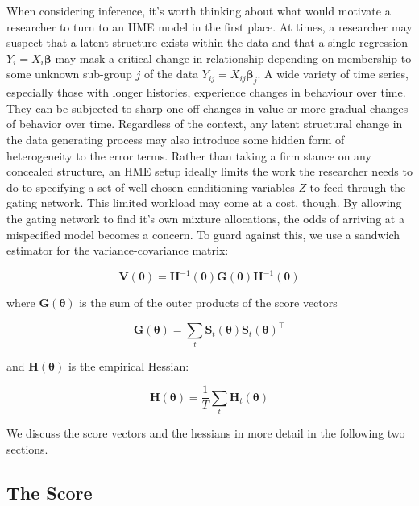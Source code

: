 \documentclass[12pt]{article}
\newcommand{\Ht}[1]{\mathbf{H}_{t}(#1)}
\newcommand{\HH}[1]{\boldsymbol{H}(#1)}
\newcommand{\HI}[1]{\boldsymbol{H}^{-1}(#1)}
\begin{document}
When considering inference, it's worth thinking about what would motivate
a researcher to turn to an HME model in the first place. At times,
a researcher may suspect that a latent structure exists within the data
and that a single regression $Y_{i} = X_{i} \boldsymbol{\beta}$
may mask a critical change in relationship depending on membership to
some unknown sub-group $j$ of the data $Y_{ij} = X_{ij} \boldsymbol{\beta}_{j}$.
A wide variety of time series, especially those with longer histories,
experience changes in behaviour over time. They can be subjected to sharp one-off
changes in value or more gradual changes of behavior over time. Regardless of
the context, any latent structural change in the data generating
process may also introduce some hidden form of heterogeneity to the error terms. 
Rather than taking a firm stance on any concealed structure, an HME
setup ideally limits the work the researcher needs to do to specifying
a set of well-chosen conditioning variables $Z$ to feed through the gating
network. This limited workload may come at a cost, though. By allowing the 
gating network to find it's own mixture allocations, the odds of arriving at a
mispecified model becomes a concern. To guard against this, we use a sandwich
estimator for the variance-covariance matrix:

\begin{equation} \label{eq:robustgatevarcov}
  \boldsymbol{V}(\boldsymbol{\theta}) = \HI{\boldsymbol{\theta}} \boldsymbol{G}(\boldsymbol{\theta}) \HI{\boldsymbol{\theta}}
\end{equation}



where $\boldsymbol{G}(\boldsymbol{\theta})$ is the sum of the outer products of the score 
vectors

\begin{equation}
  \boldsymbol{G}(\boldsymbol{\theta}) = \sum_{t} \boldsymbol{S}_{t}(\boldsymbol{\theta}) \boldsymbol{S}_{t}(\boldsymbol{\theta})^\top
\end{equation}

and $\HH{\boldsymbol{\theta}}$ is the empirical Hessian:

\begin{equation}
  \HH{\boldsymbol{\theta}} = \frac{1}{T} \sum_{t} \Ht{\boldsymbol{\theta}}
\end{equation}

We discuss the score vectors and the hessians in more detail in the following
two sections.


\subsection{The Score}
\end{document}
